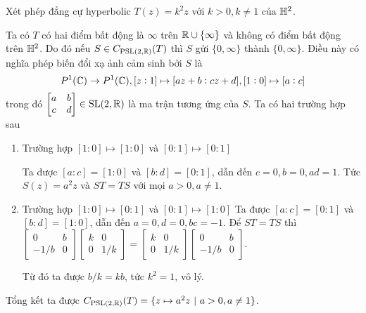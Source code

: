 \begin{exam*}
	Xét phép đẳng cự hyperbolic $T(z) = k^2z$ với $k>0, k\neq 1$ của $\mathbb{H}^2$.
		
	Ta có $T$ có hai điểm bất động là $\infty$ trên $\mathbb{R} \cup \{\infty\}$ và không có điểm bất động trên $\mathbb{H}^2$. 
	Do đó nếu $S \in C_{\operatorname{PSL}(2,\mathbb{R})}(T)$ thì $S$ gửi $\{0, \infty\}$ thành $\{0,\infty\}$. Điều này có nghĩa phép biến đổi xạ ảnh cảm sinh bởi $S$ là \[P^1(\mathbb{C}) \to P^1(\mathbb{C}), [z:1]\mapsto [az+b:cz+d], [1:0]\mapsto [a:c]\] trong đó $\begin{bmatrix} a & b \\ c & d \\ \end{bmatrix} \in \operatorname{SL}(2,\mathbb{R})$ là ma trận tương ứng của $S$.
    Ta có hai trường hợp sau
    \begin{enumerate}
        \item Trường hợp $[1:0] \mapsto [1:0]$ và $[0:1]\mapsto [0:1]$

        Ta được $[a:c] = [1:0]$ và $[b:d] = [0:1]$, dẫn đến $c = 0, b = 0, ad = 1$. Tức $S(z) = a^2z$ và $ST = TS$ với mọi $a>0, a\neq 1$.

        \item Trường hợp $[1:0] \mapsto [0:1]$ và $[0:1]\mapsto [1:0]$
        Ta được $[a:c] = [0:1]$ và $[b:d] = [1:0]$, dẫn đến $a = 0, d = 0, bc = -1$. 
        Để $ST = TS$ thì 
    $\begin{bmatrix}
        0 & b\\
        -1/b & 0
    \end{bmatrix}
    \begin{bmatrix}
        k & 0\\
        0 & 1/k
    \end{bmatrix} =
    \begin{bmatrix}
        k & 0\\
        0 & 1/k
    \end{bmatrix}
    \begin{bmatrix}
        0 & b\\
        -1/b & 0
        \end{bmatrix}$. 
        
        Từ đó ta được $b/k = kb$, tức $k^2 = 1$, vô lý.
    \end{enumerate}
    Tổng kết ta được $C_{\operatorname{PSL}(2,\mathbb{R})}(T) = \{z\mapsto a^2z~|~a > 0, a\neq 1\}$. 
\end{exam*}
